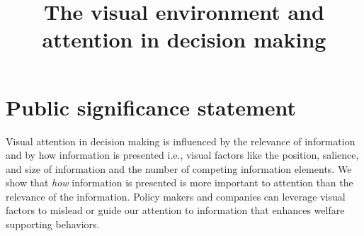 \documentclass[english,natbib,man,floatsintext,mask]{apa6}
\title{The visual environment and attention in decision making}
\begin{document}



\linenumbers
\maketitle

\section{\normalfont\normalsize Public significance statement}
\noindent Visual attention in decision making is influenced by the relevance of information and by how information is presented i.e., visual factors like the position, salience, and size of information and the number of competing information elements. We show that \textit{how} information is presented is more important to attention than the relevance of the information. Policy makers and companies can leverage visual factors to mislead or guide our attention to information that enhances welfare supporting behaviors.\par
\newpage













\clearpage



\appendix

\end{document}
